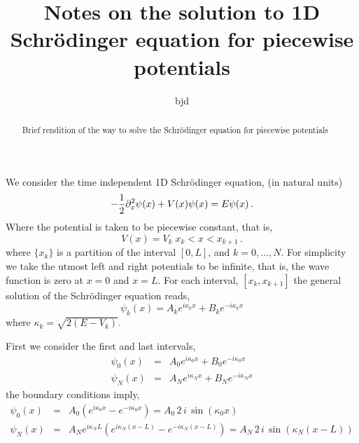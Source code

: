 \documentclass[singlecolumn]{revtex4}
\def\beq{\begin{equation}}{\it}
\def\eeq{\end{equation}}
\def\beqa{\begin{eqnarray}}{\it}
\def\eeqa{\end{eqnarray}}
\begin{document}




\title{Notes on the solution to 1D Schrödinger equation for piecewise 
potentials}
\author{bjd}

\begin{abstract}
Brief rendition of the way to solve the Schrödinger equation for piecewise potentials
\end{abstract}

\maketitle



We consider the time independent 1D Schrödinger equation, (in natural units)
\beq
-{1\over 2} \partial^2_x \psi(x) + V(x) \psi(x) =  E\psi(x)\,.
\eeq
Where the potential is taken to be piecewise constant, that is, 
\beq
V(x)= V_k \; x_k < x < x_{k+1}\,.
\eeq
where $\{x_k\}$ is a partition of the interval $[0,L]$, and $k=0,\dots,N$.  
For simplicity we take the utmost left and right potentials to be infinite, 
that is, the wave function is zero at $x=0$ and $x=L$. For each interval, $[x_k,x_{k+1}]$ the 
general solution of the Schrödinger equation reads, 
\beq
\psi_k(x) = A_k e^{i\kappa_k x} + B_k e^{-i \kappa_k x}
\eeq
where $\kappa_k=\sqrt{2 (E-V_k)}$. 

First we consider the first and last intervals,
\beqa
\psi_0(x) &=& A_0 e^{i\kappa_0 x} + B_0 e^{-i \kappa_0 x}\nonumber\\ 
\psi_N(x) &=& A_N e^{i\kappa_N x} + B_N e^{-i \kappa_N x} 
\eeqa
the boundary conditions imply,
\beqa
\psi_0(x) &=& A_0\left( e^{i\kappa_0 x} - e^{-i \kappa_0 x}\right) = A_0 \,2\, i \, \sin(\kappa_0 x) \nonumber\\ 
\psi_N(x) &=& A_N e^{i \kappa_N L} \left( e^{i\kappa_N (x-L)} - e^{-i \kappa_N (x-L)} \right)= 
A_N \,2\, i\, \sin(\kappa_N (x-L))
\label{firstlast}
\eeqa
  
\end{document}
